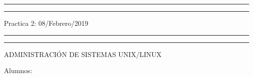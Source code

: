 \documentclass[a4paper, 11pt, oneside]{article}
\begin{document}
 

\begin{titlepage} 

	\centering 
	
	\scshape 
	
	\vspace*{\baselineskip} 
	
	
	
	\rule{\textwidth}{1.6pt}\vspace*{-\baselineskip}\vspace*{2pt} 
	\rule{\textwidth}{0.4pt} 
	
	\vspace{0.75\baselineskip} 
	
	{\LARGE Practica 2: 08/Febrero/2019}	
	\vspace{0.75\baselineskip} 
	
	\rule{\textwidth}{0.4pt}\vspace*{-\baselineskip}\vspace{3.2pt}
	\rule{\textwidth}{1.6pt} 
	
	\vspace{2\baselineskip} 
	

	ADMINISTRACIÓN DE SISTEMAS UNIX/LINUX
	
	\vspace*{3\baselineskip} 
	
	
	
	Alumnos:
	
	\vspace{0.5\baselineskip} 
	

\end{titlepage}
\end{document}
